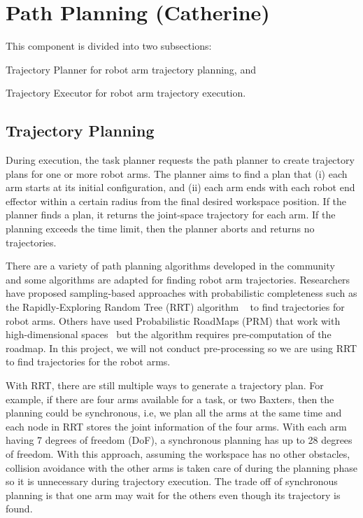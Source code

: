 \section{Path Planning (Catherine)}

This component is divided into two subsections:
\begin{enumerate*}[label=\thesection.\arabic*]
\item Trajectory Planner for robot arm trajectory planning, and
\item Trajectory Executor for robot arm trajectory execution.
\end{enumerate*}

\subsection{Trajectory Planning}

During execution, the task planner requests the path planner to create trajectory plans for one or more robot arms. The planner aims to find a plan that (i) each arm starts at its initial configuration, and (ii) each arm ends with each robot end effector within a certain radius from the final desired workspace position. If the planner finds a plan, it returns the joint-space trajectory for each arm. If the planning exceeds the time limit, then the planner aborts and returns no trajectories. 

There are a variety of path planning algorithms developed in the community~\cite{DBLP:books/daglib/0016830} and some algorithms are adapted for finding robot arm trajectories. 
Researchers have proposed sampling-based approaches with probabilistic completeness such as the Rapidly-Exploring Random Tree (RRT) algorithm ~\cite{VahrenkampBAKD09} to find trajectories for robot arms. Others have used Probabilistic RoadMaps (PRM) that work with high-dimensional spaces~\cite{KavrakiSLO96} but the algorithm requires pre-computation of the roadmap. In this project, we will not conduct pre-processing so we are using RRT to find trajectories for the robot arms.

With RRT, there are still multiple ways to generate a trajectory plan.
For example, if there are four arms available for a task, or two Baxters, then the planning could be synchronous, i.e, we plan all the arms at the same time and each node in RRT stores the joint information of the four arms. With each arm having 7 degrees of freedom (DoF), a synchronous planning has up to 28 degrees of freedom.
With this approach, assuming the workspace has no other obstacles, collision avoidance with the other arms is taken care of during the planning phase so it is unnecessary during trajectory execution.  
The trade off of synchronous planning is that one arm may wait for the others even though its trajectory is found.

